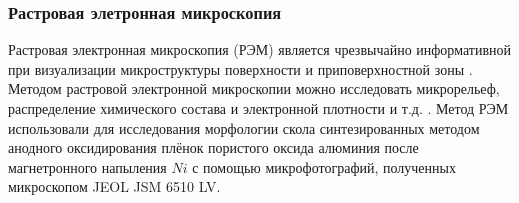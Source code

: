 
\subsubsection{Растровая элетронная микроскопия}

Растровая электронная микроскопия (РЭМ) является чрезвычайно информативной при визуализации микроструктуры поверхности и приповерхностной зоны \cite{kelcall}. Методом растровой электронной микроскопии можно исследовать микрорельеф, распределение химического состава и электронной плотности и т.д. \cite{eliseev-functsionalnie}. Метод РЭМ использовали для исследования морфологии скола синтезированных методом анодного оксидирования плёнок пористого оксида алюминия после магнетронного напыления $Ni$ с помощью микрофотографий, полученных микроскопом JEOL JSM 6510 LV.

\clearpage
